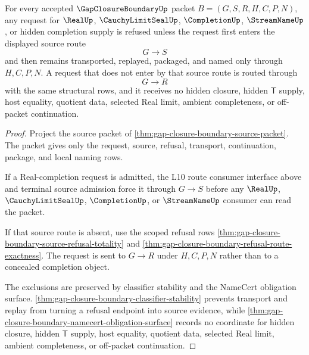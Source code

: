 \begin{theorem}
\label{thm:gap-closure-boundary-real-completion-refusal}
For every accepted $\GapClosureBoundaryUp$ packet $B=(G,S,R,H,C,P,N)$, any request for $\RealUp$, $\CauchyLimitSealUp$, $\CompletionUp$, $\StreamNameUp$, or hidden completion supply is refused unless the request first enters the displayed source route
$$
G \longrightarrow S
$$
and then remains transported, replayed, packaged, and named only through $H,C,P,N$. A request that does not enter by that source route is routed through
$$
G \longrightarrow R
$$
with the same structural rows, and it receives no hidden closure, hidden $\mathsf{T}$ supply, host equality, quotient data, selected Real limit, ambient completeness, or off-packet continuation.
\end{theorem}
\begin{proof}
Project the source packet of \autoref{thm:gap-closure-boundary-source-packet}. The packet gives only the request, source, refusal, transport, continuation, package, and local naming rows.

If a Real-completion request is admitted, the L10 route consumer interface above and terminal source admission force it through $G \longrightarrow S$ before any $\RealUp$, $\CauchyLimitSealUp$, $\CompletionUp$, or $\StreamNameUp$ consumer can read the packet.

If that source route is absent, use the scoped refusal rows \autoref{thm:gap-closure-boundary-source-refusal-totality} and \autoref{thm:gap-closure-boundary-refusal-route-exactness}. The request is sent to $G \longrightarrow R$ under $H,C,P,N$ rather than to a concealed completion object.

The exclusions are preserved by classifier stability and the NameCert obligation surface. \autoref{thm:gap-closure-boundary-classifier-stability} prevents transport and replay from turning a refusal endpoint into source evidence, while \autoref{thm:gap-closure-boundary-namecert-obligation-surface} records no coordinate for hidden closure, hidden $\mathsf{T}$ supply, host equality, quotient data, selected Real limit, ambient completeness, or off-packet continuation.
\end{proof}

